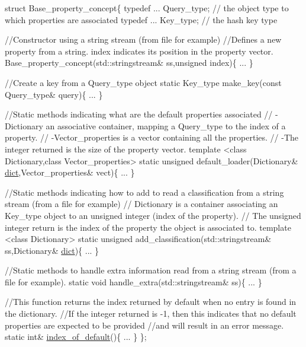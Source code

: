 \begin{DoxyCode}
\textcolor{keyword}{struct }Base\_property\_concept\{
  \textcolor{keyword}{typedef} ...                   Query\_type; \textcolor{comment}{// the object type to which properties are associated}
  \textcolor{keyword}{typedef} ...                   Key\_type;   \textcolor{comment}{// the hash key type}
  
  \textcolor{comment}{//Constructor using a string stream (from file for example)}
  \textcolor{comment}{//Defines a new property from a string. index indicates its position in the property vector.}
  Base\_property\_concept(std::stringstream& ss,\textcolor{keywordtype}{unsigned} index)\{ ... \}

  \textcolor{comment}{//Create a key from a Query\_type object}
  \textcolor{keyword}{static} Key\_type make\_key(\textcolor{keyword}{const} Query\_type& query)\{ ... \}

  \textcolor{comment}{//Static methods indicating what are the default properties associated  }
  \textcolor{comment}{//  -Dictionary an associative container, mapping a Query\_type to the index of a property.}
  \textcolor{comment}{//  -Vector\_properties is a vector containing all the properties.}
  \textcolor{comment}{//  -The integer returned is the size of the property vector.}
  \textcolor{keyword}{template} <\textcolor{keyword}{class} Dictionary,\textcolor{keyword}{class} Vector\_properties>
  \textcolor{keyword}{static} \textcolor{keywordtype}{unsigned} default\_loader(Dictionary& \hyperlink{default__atom__properties_8h_a139d37e7bfa3887f2ebe6f55677c7822}{dict},Vector\_properties& vect)\{ ... \}

  \textcolor{comment}{//Static methods indicating how to add to read a classification from a string stream (from a file for
       example) }
  \textcolor{comment}{//  Dictionary is a container associating an Key\_type object to an unsigned integer (index of the
       property).}
  \textcolor{comment}{//  The unsigned integer return is the index of the property the object is associated to.}
  \textcolor{keyword}{template} <\textcolor{keyword}{class} Dictionary>
  \textcolor{keyword}{static} \textcolor{keywordtype}{unsigned} add\_classification(std::stringstream& ss,Dictionary& \hyperlink{default__atom__properties_8h_a139d37e7bfa3887f2ebe6f55677c7822}{dict})\{ ... \}

  \textcolor{comment}{//Static methods to handle extra information read from a string stream (from a file for example).  }
  \textcolor{keyword}{static} \textcolor{keywordtype}{void} handle\_extra(std::stringstream& ss)\{ ... \}

  \textcolor{comment}{//This function returns the index returned by default when no entry is found in the dictionary.}
  \textcolor{comment}{//If the integer returned is -1, then this indicates that no default properties are expected to be
       provided}
  \textcolor{comment}{//and will result in an error message.}
  \textcolor{keyword}{static} \textcolor{keywordtype}{int}& \hyperlink{default__atom__properties_8h_aa25263697e855ec9c9d78be8fe2e8f51}{index\_of\_default}()\{ ... \}
\};
\end{DoxyCode}
 
